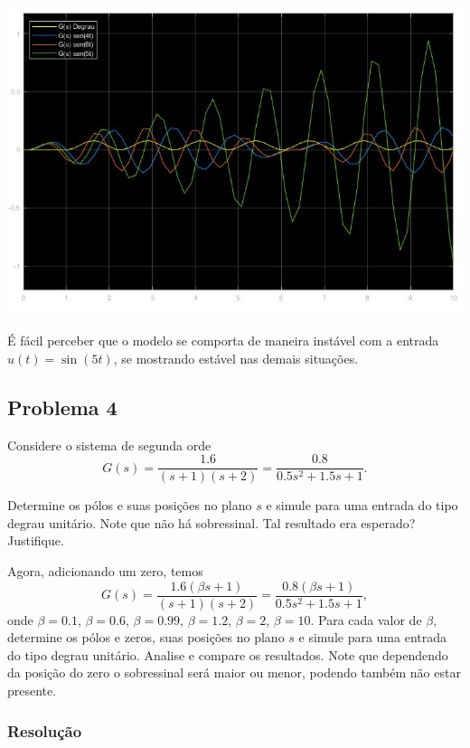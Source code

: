\documentclass[
]{book}
\begin{document}
\includegraphics{Imagens/Lab2/prob3Sim.jpg}

É fácil perceber que o modelo se comporta de maneira instável com a entrada \(u(t) = \sin(5t)\), se mostrando estável nas demais situações.

\hypertarget{problema-4}{%
\subsection*{Problema 4}\label{problema-4}}

Considere o sistema de segunda orde
\[
G(s) = \frac {1.6}{(s+1)(s+2)} = \frac {0.8}{0.5s^2+1.5s+1}.
\]

Determine os pólos e suas posições no plano \(s\) e simule para uma entrada do tipo degrau unitário. Note que não há sobressinal. Tal resultado era esperado? Justifique.

Agora, adicionando um zero, temos
\[
G(s) = \frac {1.6(\beta s+1)}{(s+1)(s+2)} = \frac {0.8(\beta s+1)}{0.5s^2 +1.5s +1},
\]
onde \(\beta = 0.1\), \(\beta = 0.6\), \(\beta = 0.99\), \(\beta = 1.2\), \(\beta = 2\), \(\beta = 10\). Para cada valor de \(\beta\), determine os pólos e zeros, suas posições no plano \(s\) e simule para uma entrada do tipo degrau unitário. Analise e compare os resultados. Note que dependendo da posição do zero o sobressinal será maior ou menor, podendo também não estar presente.

\hypertarget{resoluuxe7uxe3o-3}{%
\subsubsection*{Resolução}\label{resoluuxe7uxe3o-3}}
\end{document}
